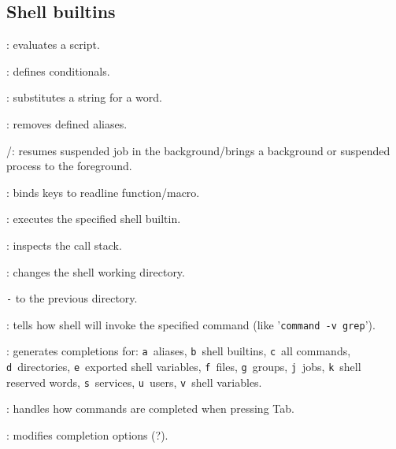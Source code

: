 %

\subsection{Shell builtins}
\begin{compactenum}
\item [\symbolbash] : evaluates a script.

\item [\symbolbash] \commandbash{[}: defines conditionals.

\item [\symbolbash] : substitutes a string for a word.
\item [\symbolbash] : removes defined aliases.

\item [\symbolbash] /: resumes suspended job in the background/brings a background or suspended process to the foreground.

\item [\symbolbash] : binds keys to readline function/macro.

\item [\symbolbash] : executes the specified shell builtin.

\item [\symbolbash] : inspects the call stack.

\item [\symbolbash] : changes the shell working directory.
\item [\texttt{-}] to the previous directory.

\item [\symbolbash] : tells how shell will invoke the specified command (like '{\small \texttt{command -v grep}}').

\item [\symbolbash] : generates completions for: \texttt{a}~aliases, \texttt{b}~shell builtins, \texttt{c}~all commands, \texttt{d}~directories, \texttt{e}~exported shell variables, \texttt{f}~files, \texttt{g}~groups, \texttt{j}~jobs, \texttt{k}~shell reserved words, \texttt{s}~services, \texttt{u}~users, \texttt{v}~shell variables.
\item [\symbolbash] : handles how commands are completed when pressing Tab.
\item [\symbolbash] : modifies completion options (?).


\end{compactenum}
